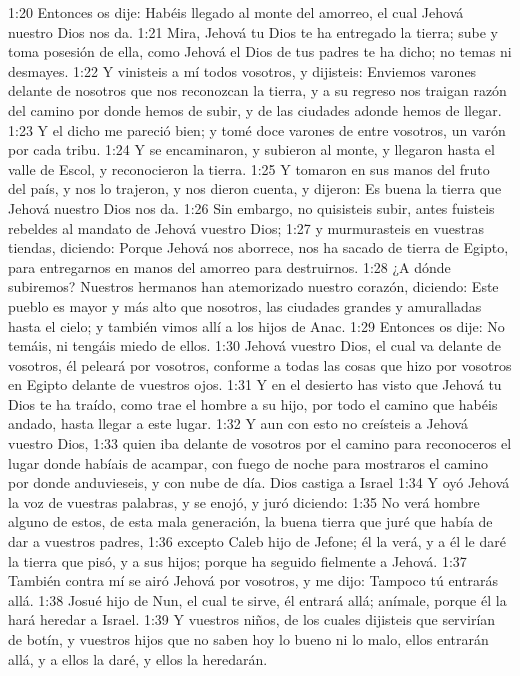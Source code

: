 1:20 Entonces os dije: Habéis llegado al monte del amorreo, el cual Jehová nuestro Dios nos da.  
1:21 Mira, Jehová tu Dios te ha entregado la tierra; sube y toma posesión de ella, como Jehová el Dios de tus padres te ha dicho; no temas ni desmayes.  
1:22 Y vinisteis a mí todos vosotros, y dijisteis: Enviemos varones delante de nosotros que nos reconozcan la tierra, y a su regreso nos traigan razón del camino por donde hemos de subir, y de las ciudades adonde hemos de llegar.  
1:23 Y el dicho me pareció bien; y tomé doce varones de entre vosotros, un varón por cada tribu.  
1:24 Y se encaminaron, y subieron al monte, y llegaron hasta el valle de Escol, y reconocieron la tierra.  
1:25 Y tomaron en sus manos del fruto del país, y nos lo trajeron, y nos dieron cuenta, y dijeron: Es buena la tierra que Jehová nuestro Dios nos da.  
1:26 Sin embargo, no quisisteis subir, antes fuisteis rebeldes al mandato de Jehová vuestro Dios;  
1:27 y murmurasteis en vuestras tiendas, diciendo: Porque Jehová nos aborrece, nos ha sacado de tierra de Egipto, para entregarnos en manos del amorreo para destruirnos.  
1:28 ¿A dónde subiremos? Nuestros hermanos han atemorizado nuestro corazón, diciendo: Este pueblo es mayor y más alto que nosotros, las ciudades grandes y amuralladas hasta el cielo; y también vimos allí a los hijos de Anac. 
1:29 Entonces os dije: No temáis, ni tengáis miedo de ellos.  
1:30 Jehová vuestro Dios, el cual va delante de vosotros, él peleará por vosotros, conforme a todas las cosas que hizo por vosotros en Egipto delante de vuestros ojos.  
1:31 Y en el desierto has visto que Jehová tu Dios te ha traído, como trae el hombre a su hijo, por todo el camino que habéis andado, hasta llegar a este lugar.  
1:32 Y aun con esto no creísteis a Jehová vuestro Dios, 
1:33 quien iba delante de vosotros por el camino para reconoceros el lugar donde habíais de acampar, con fuego de noche para mostraros el camino por donde anduvieseis, y con nube de día.  
Dios castiga a Israel   
1:34 Y oyó Jehová la voz de vuestras palabras, y se enojó, y juró diciendo:  
1:35 No verá hombre alguno de estos, de esta mala generación, la buena tierra que juré que había de dar a vuestros padres,  
1:36 excepto Caleb hijo de Jefone; él la verá, y a él le daré la tierra que pisó, y a sus hijos; porque ha seguido fielmente a Jehová.  
1:37 También contra mí se airó Jehová por vosotros, y me dijo: Tampoco tú entrarás allá.  
1:38 Josué hijo de Nun, el cual te sirve, él entrará allá; anímale, porque él la hará heredar a Israel.  
1:39 Y vuestros niños, de los cuales dijisteis que servirían de botín, y vuestros hijos que no saben hoy lo bueno ni lo malo, ellos entrarán allá, y a ellos la daré, y ellos la heredarán.  
